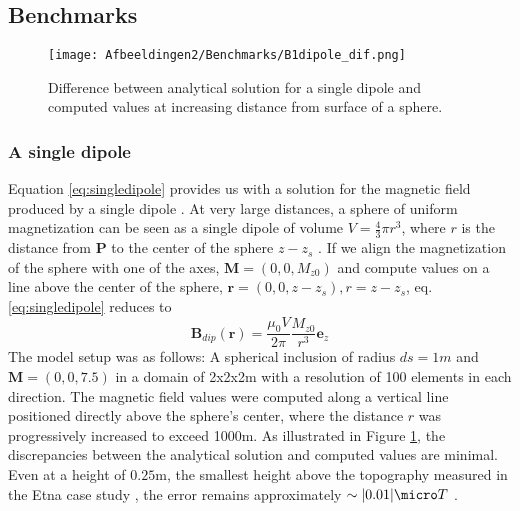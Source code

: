 
\subsection{Benchmarks}

\begin{figure}
\centering
   \texttt{[image: Afbeeldingen2/Benchmarks/B1dipole\_dif.png]}
    \caption{Difference between analytical solution for a single dipole and computed values at increasing distance from surface of a sphere. }
    \label{fig:dipoleresults}
\end{figure} 
\subsubsection{A single dipole}
Equation \ref{eq:singledipole} provides us with a solution for the magnetic field produced by a single dipole \parencite{GRIFFITHS,BLAKELY}. At very large distances, a sphere of uniform magnetization can be seen as a single dipole of volume $V=\frac{4}{3}\pi r^3$, where $r$ is the distance from $\mathbf{P}$ to the center of the sphere $z-z_s$ \parencite{BLAKELY}. If we align the magnetization of the sphere with one of the axes, $\mathbf{M}=(0,0,M_{z0})$ and compute values on a line above the center of the sphere, $\mathbf{r}=(0,0,z-z_s), r=z-z_s$,  eq.  \ref{eq:singledipole} reduces to
\begin{equation}
\mathbf{B}_{dip}(\mathbf{r}) = \frac{\mu_0 V}{2\pi} \frac{M_{z0}}{r^3}   \mathbf{e}_z
\end{equation}
The model setup was as follows: A spherical inclusion of radius $ds=1m$ and $\mathbf{M}= (0,0,7.5) $ in a domain of 2x2x2m with a resolution of 100 elements in each direction. The magnetic field values were computed along a vertical line positioned directly above the sphere's center, where the distance $r$ was progressively increased to exceed 1000m.  As illustrated in Figure \ref{fig:dipoleresults}, the discrepancies between the analytical solution and computed values are minimal. Even at a height of  $0.25$m, the smallest height above the topography measured in the Etna case study \parencite{Meyer23}, the error remains approximately $\sim|0.01| \micro T$ . 

